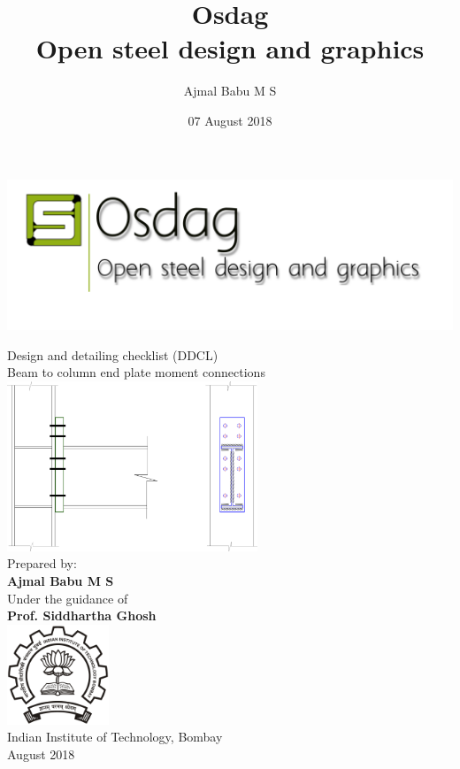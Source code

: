 \documentclass[11.5pt,a4paper,oneside]{report}
\begin{document}
	\title{Osdag\\ Open steel design and graphics}
	\author{Ajmal Babu M S}
	\date{07 August 2018}
\pagestyle{fancy}
\lhead{}
\chead{}
\cfoot{}
\rfoot{\thepage}
\renewcommand{\headrulewidth}{2pt}
\renewcommand{\footrulewidth}{1pt}
\newcommand{\univ}{Indian Institute of Technology, Bombay}
\begin{titlepage}
	\begin{center}
		\begin{center}
			\includegraphics {logoOsdag.png}
		\end{center}
	
			{\LARGE {Design and detailing checklist (DDCL)}}\\
			\vspace{1cm}
			{\LARGE {Beam to column end plate  moment connections}} \\
			\vspace{1cm}		
			\includegraphics[height=2in]{view.png} \\	
			\vspace{3cm}
			 {\small {Prepared by:}} \\
			 {\Large \textbf {Ajmal Babu M S}} \\	
			\vspace{0.5cm}	
			{\small {Under the guidance of} }\\
			{\Large \textbf {Prof. Siddhartha Ghosh}} \\	
			\vspace{1cm}
			\centering
			\includegraphics[width=1.2in]{logo.png} \\	
 			\vspace{0.5cm}
			{\univ} \\ 
			\vspace{0.15cm}		
			{August 2018}
	\end{center}
\end{titlepage}
\end{document}
